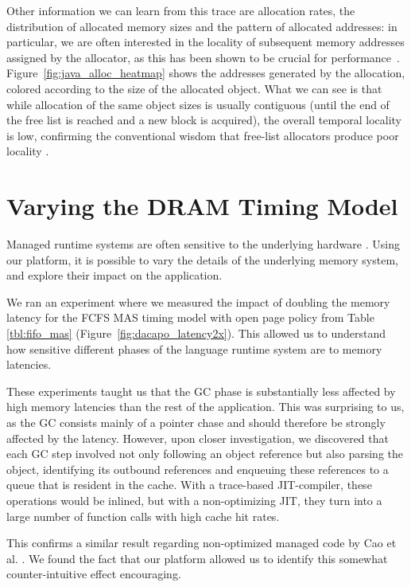 Other information we can learn from this trace are allocation rates, the
distribution of allocated memory sizes and the pattern of allocated addresses:
in particular, we are often interested in the locality of subsequent memory
addresses assigned by the allocator, as this has been shown to be crucial for
performance~\cite{Blackburn:2004:OWH:998675.999420}.
Figure~\ref{fig:java_alloc_heatmap} shows the addresses generated by the
allocation, colored according to the size of the allocated object. What we can
see is that while allocation of the same object sizes is usually contiguous
(until the end of the free list is reached and a new block is acquired), the
overall temporal locality is low, confirming the conventional wisdom that
free-list allocators produce poor locality
\cite{Blackburn:2004:OWH:998675.999420}.

\section{Varying the DRAM Timing Model}

Managed runtime systems are often sensitive to the underlying hardware
\cite{Cao:2012:YYP:2337159.2337185}. Using our platform, it is possible to vary
the details of the underlying memory system, and explore their impact on the
application.

We ran an experiment where we measured the impact of doubling the memory
latency for the FCFS MAS timing model with open page policy from Table
\ref{tbl:fifo_mas} (Figure~\ref{fig:dacapo_latency2x}). This allowed us to
understand how sensitive different phases of the language runtime system are to
memory latencies.

These experiments taught us that the GC phase is substantially less affected by
high memory latencies than the rest of the application. This was surprising to
us, as the GC consists mainly of a pointer chase and should therefore be
strongly affected by the latency. However, upon closer investigation, we
discovered that each GC step involved not only following an object reference
but also parsing the object, identifying its outbound references and enqueuing
these references to a queue that is resident in the cache. With a trace-based
JIT-compiler, these operations would be inlined, but with a non-optimizing JIT,
they turn into a large number of function calls with high cache hit rates.

This confirms a similar result regarding non-optimized managed code by Cao et
al. \cite{Cao:2012:YYP:2337159.2337185}. We found the fact that our platform
allowed us to identify this somewhat counter-intuitive effect encouraging.


